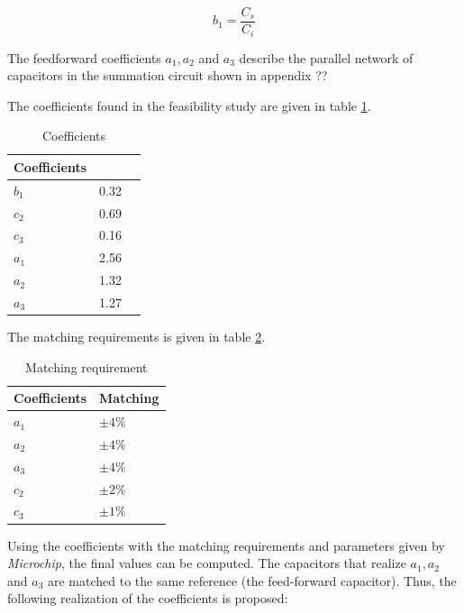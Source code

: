 \begin{equation}
    b_1 = \frac{C_s}{C_i}
\end{equation}

The feedforward coefficients $a_1, a_2$ and $a_3$ describe the parallel network of capacitors in the summation circuit shown in appendix ??

The coefficients found in the feasibility study are given in table \ref{scale}.

\begin{table}[h]
\centering
\caption{Coefficients}
\label{scale}
\begin{tabular}{|l|l|l|}
\hline
Coefficients  &      \\ \hline
$b_1$         & 0.32 \\ \hline
$c_2$         & 0.69 \\ \hline
$c_3$         & 0.16 \\ \hline
$a_1$         & 2.56 \\ \hline
$a_2$         & 1.32 \\ \hline
$a_3$         & 1.27 \\ \hline
\end{tabular}
\end{table}

The matching requirements is given in table \ref{match}.

\begin{table}[h!]
\centering
\caption{Matching requirement}
\label{match}
\begin{tabular}{|l|l|}
\hline
Coefficients & Matching \\ \hline
$a_1$           & $\pm4\%$        \\ \hline
$a_2$           & $\pm4\%$        \\ \hline
$a_3$           & $\pm4\%$        \\ \hline
$c_2$           & $\pm2\%$      \\ \hline
$c_3$           & $\pm1\%$        \\ \hline
\end{tabular}
\end{table}

Using the coefficients with the matching requirements and parameters given by \textit{Microchip}, the final values can be computed. The capacitors that realize  $a_1, a_2$ and $a_3$ are matched to the same reference (the feed-forward capacitor). Thus, the following realization of the coefficients is proposed:

